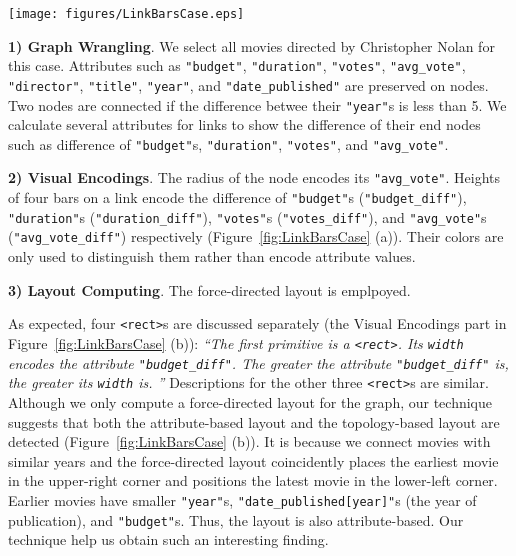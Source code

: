 \begin{figure*}[ht]
    \centering
    \texttt{[image: figures/LinkBarsCase.eps]}
    \caption{xxx}
    \label{fig:LinkBarsCase}
\end{figure*}

\textbf{1) Graph Wrangling}.
We select all movies directed by Christopher Nolan for this case.
Attributes such as \texttt{"budget"}, \texttt{"duration"}, \texttt{"votes"}, \texttt{"avg\_vote"}, \texttt{"director"}, \texttt{"title"}, \texttt{"year"}, and \texttt{"date\_published"} are preserved on nodes.
Two nodes are connected if the difference betwee their \texttt{"year"}s is less than 5.
We calculate several attributes for links to show the difference of their end nodes such as difference of \texttt{"budget"}s, \texttt{"duration"}, \texttt{"votes"}, and \texttt{"avg\_vote"}.

\textbf{2) Visual Encodings}.
The radius of the node encodes its \texttt{"avg\_vote"}.
Heights of four bars on a link encode the difference of \texttt{"budget"}s (\texttt{"budget\_diff"}), \texttt{"duration"}s (\texttt{"duration\_diff"}), \texttt{"votes"}s (\texttt{"votes\_diff"}), and \texttt{"avg\_vote"}s (\texttt{"avg\_vote\_diff"}) respectively (Figure~\ref{fig:LinkBarsCase} (a)).
Their colors are only used to distinguish them rather than encode attribute values.

\textbf{3) Layout Computing}.
The force-directed layout is emplpoyed.

As expected, four \texttt{<rect>}s are discussed separately (the Visual Encodings part in Figure~\ref{fig:LinkBarsCase} (b)):
\textit{``The first primitive is a \texttt{<rect>}. Its \texttt{width} encodes the attribute \texttt{"budget\_diff"}. The greater the attribute \texttt{"budget\_diff"} is, the greater its \texttt{width} is.
''}
Descriptions for the other three \texttt{<rect>}s are similar.
Although we only compute a force-directed layout for the graph, our technique suggests that both the attribute-based layout and the topology-based layout are detected (Figure~\ref{fig:LinkBarsCase} (b)).
It is because we connect movies with similar years and the force-directed layout coincidently places the earliest movie in the upper-right corner and positions the latest movie in the lower-left corner.
Earlier movies have smaller \texttt{"year"}s, \texttt{"date\_published[year]"}s (the year of publication), and \texttt{"budget"}s.
Thus, the layout is also attribute-based.
Our technique help us obtain such an interesting finding.